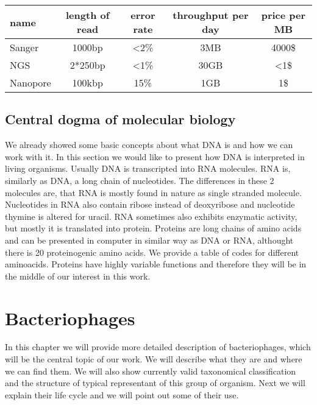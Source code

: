 \begin{center}
  \begin{tabular}{ | l | c | c | c | c | }
    \hline
    name & length of read & error rate & throughput per day & price per MB \\
    \hline
    Sanger & 1000bp & <2\% & 3MB & 4000\$ \\
    NGS & 2*250bp & <1\% & 30GB & <1\$ \\
    Nanopore & 100kbp & 15\% & 1GB & 1\$ \\
    \hline
  \end{tabular}
\end{center}

\section{Central dogma of molecular biology}
We already showed some basic concepts about what DNA is and how we can work with it.
In this section we would like to present how DNA is interpreted in living organisms.
Usually DNA is transcripted into RNA molecules.
RNA is, similarly as DNA, a long chain of nucleotides.
The differences in these 2 molecules are, that RNA is mostly found in nature as single stranded molecule.
Nucleotides in RNA also contain ribose instead of deoxyribose and nucleotide thymine is altered for uracil.
RNA sometimes also exhibits enzymatic activity, but mostly it is translated into protein.
Proteins are long chains of amino acids and can be presented in computer in similar way as DNA or RNA, althought there is 20 proteinogenic amino acids.
We provide a table of codes for different aminoacids.
Proteins have highly variable functions and therefore they will be in the middle of our interest in this work.

\chapter{Bacteriophages}
In this chapter we will provide more detailed description of bacteriophages, which will be the central topic of our work.
We will describe what they are and where we can find them.
We will also show currently valid taxonomical classification and the structure of typical representant of this group of organism.
Next we will explain their life cycle and we will point out some of their use.


